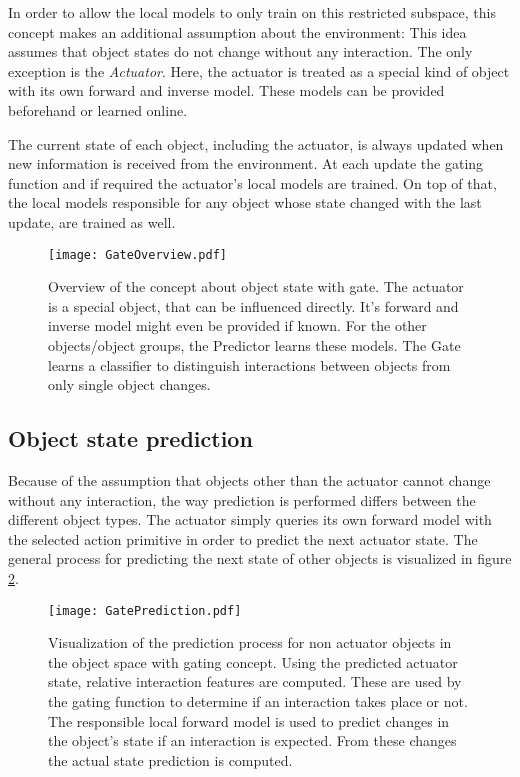 In order to allow the local models to only train on this restricted subspace, this concept makes an additional assumption about the environment: 
This idea assumes that object states do not change without any interaction. The only exception is the \textit{Actuator}. Here, the actuator is treated as a special kind of object with its own forward and inverse model. These models can be provided beforehand or learned online.  

The current state of each object, including the actuator, is always updated when new information is received from the environment. At each update the gating function and if required the actuator's local models are trained. On top of that, the local models responsible for any object whose state changed with the last update, are trained as well.


\begin{figure}
	\centering
	\texttt{[image: GateOverview.pdf]}
	\caption{Overview of the concept about object state with gate. The actuator is a special object, that can be influenced directly. It's forward and inverse model might even be provided if known. For the other objects/object groups, the Predictor learns these models. The Gate learns a classifier to distinguish interactions between objects from only single object changes.} 
	\label{fig:GateOverview}
\end{figure}

\subsection{Object state prediction \label{sec:gatePrediction}}

Because of the assumption that objects other than the actuator cannot change without any interaction, the way prediction is performed differs between the different object types. The actuator simply queries its own forward model with the selected action primitive in order to predict the next actuator state. 
The general process for predicting the next state of other objects is visualized in figure \ref{fig:GatePrediction}.

\begin{figure}
	\centering
	\texttt{[image: GatePrediction.pdf]}
	\caption{Visualization of the prediction process for non actuator objects in the object space with gating concept. Using the predicted actuator state, relative interaction features are computed. These are used by the gating function to determine if an interaction takes place or not. The responsible local forward model is used to predict 
	changes in the object's state if an interaction is expected. From these changes the actual state prediction is computed.} 
	\label{fig:GatePrediction}
\end{figure}

